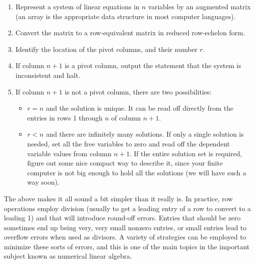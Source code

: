 \documentclass{ximera}
\begin{document}
\begin{enumerate}
\item Represent a system of linear equations in $n$ variables by an augmented matrix (an array is the appropriate data structure in most computer languages).
\item Convert the matrix to a row-equivalent matrix in reduced row-echelon form.
\item Identify the location of the pivot columns, and their number $r$.
\item If column $n+1$ is a pivot column, output the statement that the system is inconsistent and halt.
\item If column $n+1$ is not a pivot column, there are two possibilities:
\begin{itemize}\item $r=n$ and the solution is unique.  It can be read off directly from the entries in rows 1 through $n$ of column $n+1$.
\item
$r<n$ and there are infinitely many solutions.
If only a single solution is needed, set all the free variables to zero and read off the dependent variable values from column $n+1$.  If the entire solution set is required, figure out some nice compact way to describe it, since your finite computer is not big enough to hold all the solutions (we will have such a way soon).
\end{itemize}
\end{enumerate}


The above makes it all sound a bit simpler than it really is.  In practice, row operations employ division (usually to get a leading entry of a row to convert to a leading 1) and that will introduce round-off errors.  Entries that should be zero sometimes end up being very, very small nonzero entries, or small entries lead to overflow errors when used as divisors.  A variety of strategies can be employed to minimize these sorts of errors, and this is one of the main topics in the important subject known as numerical linear algebra.
\end{document}
